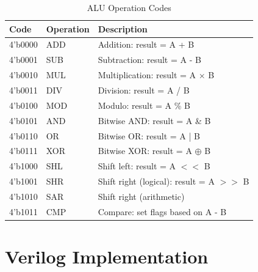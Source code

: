 \documentclass[12pt,a4paper,oneside]{book}
\begin{document}
\begin{table}[H]
\centering
\caption{ALU Operation Codes}
\label{tab:alu-ops}
\begin{tabularx}{\textwidth}{|l|l|X|}
\hline
\textbf{Code} & \textbf{Operation} & \textbf{Description} \\
\hline
4'b0000 & ADD & Addition: result = A + B \\
4'b0001 & SUB & Subtraction: result = A - B \\
4'b0010 & MUL & Multiplication: result = A $\times$ B \\
4'b0011 & DIV & Division: result = A / B \\
4'b0100 & MOD & Modulo: result = A \% B \\
4'b0101 & AND & Bitwise AND: result = A \& B \\
4'b0110 & OR & Bitwise OR: result = A | B \\
4'b0111 & XOR & Bitwise XOR: result = A $\oplus$ B \\
4'b1000 & SHL & Shift left: result = A $<<$ B \\
4'b1001 & SHR & Shift right (logical): result = A $>>$ B \\
4'b1010 & SAR & Shift right (arithmetic) \\
4'b1011 & CMP & Compare: set flags based on A - B \\
\hline
\end{tabularx}
\end{table}

\section{Verilog Implementation}
\end{document}
